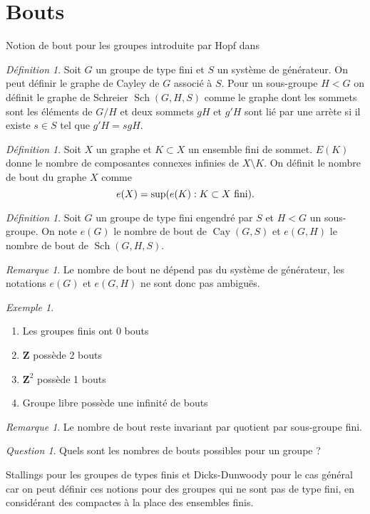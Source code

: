 \documentclass[a4paper]{article}
\theoremstyle{remark}%
\newtheorem{defn}[lem]{Définition}
\newtheorem{exmp}[lem]{Exemple}
\newtheorem{rem}[lem]{Remarque}
\newtheorem{quest}[lem]{Question}
\DeclareMathOperator\Cay{Cay}
\DeclareMathOperator\Sch{Sch}
\DeclarePairedDelimiter\parent{\lparen}{\rparen}
\newcommand*{\field}[1]{\mathbf{#1}}
\newcommand*{\Z}{\field{Z}}
\begin{document}
\section{Bouts}
Notion de bout pour les groupes introduite par Hopf dans \cite{Hopf1944}
\begin{defn}
Soit $G$ un groupe de type fini et $S$ un système de générateur. On peut définir le graphe de Cayley de $G$ associé à $S$. Pour un sous-groupe $H<G$ on définit le graphe de Schreier $\Sch(G,H,S)$ comme le graphe dont les sommets sont les éléments de $G/H$ et deux sommets $gH$ et $g'H$ sont lié par une arrète si il existe $s \in S$ tel que $g'H = sgH$.
\end{defn}
%
\begin{defn}
Soit $X$ un graphe et $K \subset X$ un ensemble fini de sommet. $E(K)$ donne le nombre de composantes connexes infinies de $X \setminus K$. On définit le nombre de bout du graphe $X$ comme 
\begin{equation*}
e(X) = \sup \parent*{e(K) : K \subset X \text{ fini}}.
\end{equation*}
\end{defn}
%
\begin{defn}
Soit $G$ un groupe de type fini engendré par $S$ et $H<G$ un sous-groupe. On note $e(G)$ le nombre de bout de $\Cay(G,S)$ et $e(G,H)$ le nombre de bout de $\Sch(G,H,S)$.
\end{defn}
%
\begin{rem}
Le nombre de bout ne dépend pas du système de générateur, les notations $e(G)$ et $e(G,H)$ ne sont donc pas ambiguës.
\end{rem}
\begin{exmp}
\begin{enumerate}
\item Les groupes finis ont $0$ bouts
\item $\Z$ possède 2 bouts
\item $\Z^2$ possède 1 bouts
\item Groupe libre possède une infinité de bouts
\end{enumerate}
\end{exmp}
%
\begin{rem}
Le nombre de bout reste invariant par quotient par sous-groupe fini.
\end{rem}
%
\begin{quest}
Quels sont les nombres de bouts possibles pour un groupe ?
\end{quest}
%
Stallings \cite{Stallings1971} pour les groupes de types finis et Dicks-Dunwoody pour le cas général \cite{Dicks1989} car on peut définir ces notions pour des groupes qui ne sont pas de type fini, en considérant des compactes à la place des ensembles finis.
\end{document}
